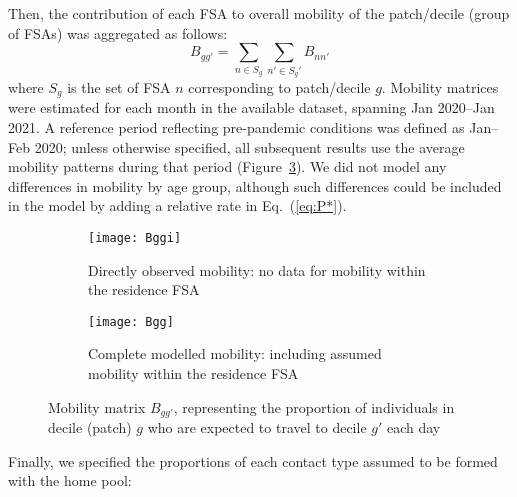 Then, the contribution of each FSA to overall mobility of the patch/decile (group of FSAs)
was aggregated as follows:
\begin{equation}\label{eq:Bgg}
  B_{gg'} = \sum_{n \in S_g}\sum_{n' \in S_g'} B_{nn'}
\end{equation}
where $S_g$ is the set of FSA $n$ corresponding to patch/decile $g$.
Mobility matrices were estimated for each month in the available dataset,
spanning Jan 2020--Jan 2021.
A reference period reflecting pre-pandemic conditions was defined as Jan--Feb 2020;
unless otherwise specified, all subsequent results use the average mobility patterns during that period
(Figure~\ref{fig:Bgg}).
We did not model any differences in mobility by age group,
although such differences could be included in the model by adding a relative rate in Eq.~(\ref{eq:P*}).
\begin{figure}
  \centering
  \begin{subfigure}{0.49\linewidth}
    \texttt{[image: Bggi]}
    \caption{Directly observed mobility: no data for mobility within the residence FSA}
    \label{fig:Bggo}
  \end{subfigure}\hfill%
  \begin{subfigure}{0.49\linewidth}
    \texttt{[image: Bgg]}
    \caption{Complete modelled mobility: including assumed mobility within the residence FSA}
    \label{fig:Bggd}
  \end{subfigure}
  \caption{Mobility matrix $B_{gg'}$, representing
    the proportion of individuals in decile (patch) $g$ who are expected to travel to decile $g'$ each day}
  \label{fig:Bgg}
\end{figure}
\par
Finally, we specified the proportions of each contact type assumed to be formed with the home pool:
